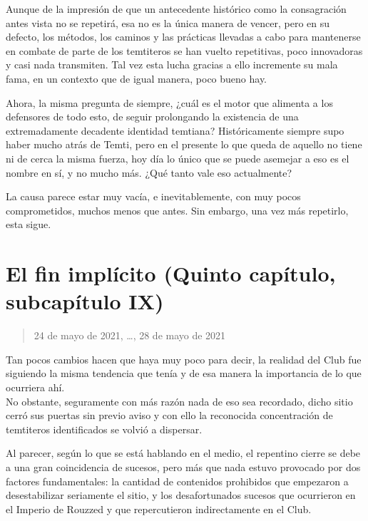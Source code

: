 \documentclass[
  spanish,
]{book}
\begin{document}
Aunque de la impresión de que un antecedente histórico como la consagración antes vista no se repetirá, esa no es la única manera de vencer, pero en su defecto, los métodos, los caminos y las prácticas llevadas a cabo para mantenerse en combate de parte de los temtiteros se han vuelto repetitivas, poco innovadoras y casi nada transmiten. Tal vez esta lucha gracias a ello incremente su mala fama, en un contexto que de igual manera, poco bueno hay.

Ahora, la misma pregunta de siempre, ¿cuál es el motor que alimenta a los defensores de todo esto, de seguir prolongando la existencia de una extremadamente decadente identidad temtiana? Históricamente siempre supo haber mucho atrás de Temti, pero en el presente lo que queda de aquello no tiene ni de cerca la misma fuerza, hoy día lo único que se puede asemejar a eso es el nombre en sí, y no mucho más. ¿Qué tanto vale eso actualmente?

La causa parece estar muy vacía, e inevitablemente, con muy pocos comprometidos, muchos menos que antes. Sin embargo, una vez más repetirlo, esta sigue.

\hypertarget{el-fin-impluxedcito-quinto-capuxedtulo-subcapuxedtulo-ix}{%
\section{El fin implícito (Quinto capítulo, subcapítulo IX)}\label{el-fin-impluxedcito-quinto-capuxedtulo-subcapuxedtulo-ix}}

\begin{quote}
24 de mayo de 2021, \ldots, 28 de mayo de 2021
\end{quote}

Tan pocos cambios hacen que haya muy poco para decir, la realidad del Club fue siguiendo la misma tendencia que tenía y de esa manera la importancia de lo que ocurriera ahí.\\
No obstante, seguramente con más razón nada de eso sea recordado, dicho sitio cerró sus puertas sin previo aviso y con ello la reconocida concentración de temtiteros identificados se volvió a dispersar.

Al parecer, según lo que se está hablando en el medio, el repentino cierre se debe a una gran coincidencia de sucesos, pero más que nada estuvo provocado por dos factores fundamentales: la cantidad de contenidos prohibidos que empezaron a desestabilizar seriamente el sitio, y los desafortunados sucesos que ocurrieron en el Imperio de Rouzzed y que repercutieron indirectamente en el Club.
\end{document}
